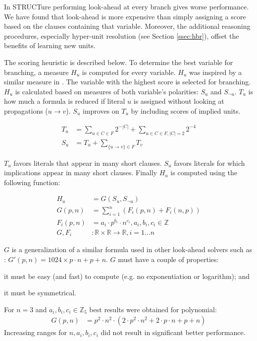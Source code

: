 In STRUCTure performing look-ahead at every branch gives worse
performance. We have found that look-ahead is more expensive
than simply assigning a score based on the clauses containing
that variable. Moreover, the additional reasoning procedures,
especially hyper-unit resolution (see Section \ref{ssec:hbr}),
offset the benefits of learning new units.

The scoring heuristic is described below. To determine the
best variable for branching, a measure $H_u$ is computed for
every variable.  $H_u$ was inspired by a similar measure in
\cite{mine:oksolver}. The variable with the highest score is
selected for branching.  $H_u$ is calculated based on measures of
both variable's polarities: $S_u$ and $S_{\neg u}$. $T_u$ is how much
a formula is reduced if literal $u$ is assigned without looking
at propagations ($u \rightarrow v$). $S_u$ improves on $T_u$ by
including scores of implied units.

\begin{align}
  T_u &= \sum_{u \in C \in F}{2^{-|C|}} + \sum_{u \in C \in F, |C| = 2}{2^{-4}} \\
  S_u &= T_u + \sum_{\{ u \rightarrow v \} \in F}{T_v}
\end{align}

$T_u$ favors literals that appear in many short clauses.  $S_u$
favors literals for which implications appear in many short clauses.
Finally $H_u$ is computed using the following function:

\begin{align}
  H_u &= G(S_u, S_{\neg u}) \\
  G(p, n) &= \sum_{i=1}^{n}{(F_i(p, n) + F_i(n, p))} \\
  F_i(p, n) &= a_i \cdot p^{b_i} \cdot n^{c_i}, a_i, b_i, c_i \in \mathbb{Z} \\
  G, F_i &: \mathbb{R} \times \mathbb{R} \rightarrow \mathbb{R}, i = 1 \ldots n
\end{align}

$G$ is a generalization of a similar formula used in other
look-ahead solvers such as \cite{mine:march}: $G'(p, n) =
1024 \times p \cdot n + p + n$. $G$ must have a couple of properties:
\begin{inparaenum}[a)]
  \item it must be easy (and fast) to compute (e.g. no exponentiation or logarithm); and
  \item it must be symmetrical.
\end{inparaenum}

For $n = 3$ and $a_i, b_i, c_i \in \mathbb{Z}_5$ best results were
obtained for polynomial:
\begin{align}
  G(p, n) &=  p^2 \cdot n^2 \cdot (2 \cdot p^2 \cdot n^2 + 2 \cdot p \cdot n + p + n)
\end{align}
Increasing ranges for $n, a_i, b_i, c_i$ did not result in
significant better performance.


